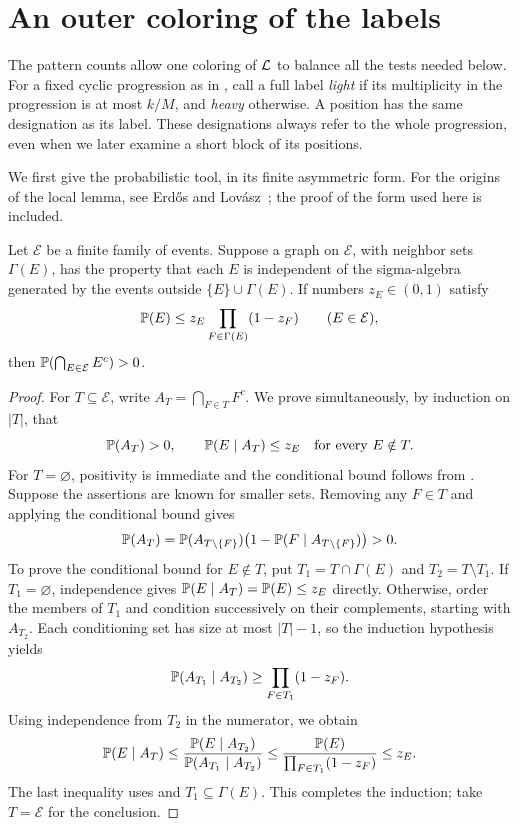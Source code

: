 \section{An outer coloring of the labels}
\label{sec:outer}

The pattern counts allow one coloring of $\mathcal L$ to balance all the
tests needed below. For a fixed cyclic progression as in
, call a full label \emph{light} if its multiplicity
in the progression is at most $k/M$, and \emph{heavy} otherwise.
A position has the same designation as its label. These designations
always refer to the whole progression, even when we later examine a
short block of its positions.

We first give the probabilistic tool, in its finite asymmetric form.
For the origins of the local lemma, see Erd\H{o}s and
Lov\'asz~\cite{erdosLovasz1975}; the proof of the form used here is included.

\begin{lemma}\label{outer:lll}
Let $\mathcal E$ be a finite family of events. Suppose a graph on
$\mathcal E$, with neighbor sets $\Gamma(E)$, has the property that each
$E$ is independent of the sigma-algebra generated by the events outside
$\{E\}\cup\Gamma(E)$. If numbers $z_E\in(0,1)$ satisfy
\begin{equation}\label{outer:lll-condition}
 \mathbb P(E)\le z_E\prod_{F\in\Gamma(E)}(1-z_F)
 \qquad(E\in\mathcal E),
\end{equation}
then $\mathbb P(\bigcap_{E\in\mathcal E}E^c)>0$.
\end{lemma}

\begin{proof}
For $T\subseteq\mathcal E$, write $A_T=\bigcap_{F\in T}F^c$.
We prove simultaneously, by induction on $|T|$, that
\begin{equation}\label{outer:conditional}
 \mathbb P(A_T)>0,
 \qquad
 \mathbb P(E\mid A_T)\le z_E\quad\text{for every }E\notin T.
\end{equation}
For $T=\varnothing$, positivity is immediate and the conditional bound
follows from . Suppose the assertions are
known for smaller sets. Removing any $F\in T$ and applying the
conditional bound gives
\[
 \mathbb P(A_T)=\mathbb P(A_{T\setminus\{F\}})
 \bigl(1-\mathbb P(F\mid A_{T\setminus\{F\}})\bigr)>0.
\]
To prove the conditional bound for $E\notin T$, put
$T_1=T\cap\Gamma(E)$ and $T_2=T\setminus T_1$.
If $T_1=\varnothing$, independence gives
$\mathbb P(E\mid A_T)=\mathbb P(E)\le z_E$ directly.
Otherwise, order the members of $T_1$ and condition successively on
their complements, starting with $A_{T_2}$. Each conditioning set has
size at most $|T|-1$, so the induction hypothesis yields
\[
 \mathbb P(A_{T_1}\mid A_{T_2})
 \ge\prod_{F\in T_1}(1-z_F).
\]
Using independence from $T_2$ in the numerator, we obtain
\[
 \mathbb P(E\mid A_T)
 \le\frac{\mathbb P(E\mid A_{T_2})}
             {\mathbb P(A_{T_1}\mid A_{T_2})}
 \le\frac{\mathbb P(E)}{\prod_{F\in T_1}(1-z_F)}
 \le z_E.
\]
The last inequality uses  and
$T_1\subseteq\Gamma(E)$. This completes the induction; take
$T=\mathcal E$ for the conclusion.
\end{proof}


